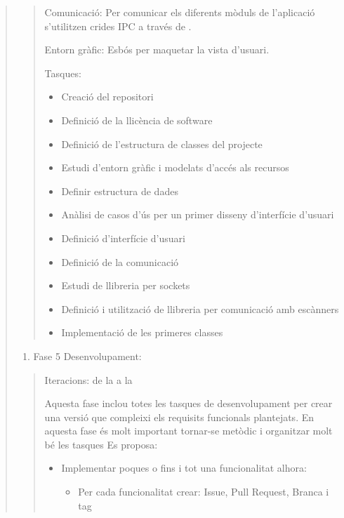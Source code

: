 \documentclass[letterpaper,11pt,catalan]{sphinxmanual}
\begin{document}
\begin{quote}
\begin{quote}
Comunicació: Per comunicar els diferents mòduls de l'aplicació s'utilitzen crides
IPC a través de .

Entorn gràfic: Esbós per maquetar la vista d'usuari.

Tasques:
\begin{itemize}
\item {} 
Creació del repositori

\item {} 
Definició de la llicència de software

\item {} 
Definició de l'estructura de classes del projecte

\item {} 
Estudi d'entorn gràfic i modelats d'accés als recursos

\item {} 
Definir estructura de dades

\item {} 
Anàlisi de casos d'ús per un primer disseny d'interfície d'usuari

\item {} 
Definició d'interfície d'usuari

\item {} 
Definició de la comunicació

\item {} 
Estudi de llibreria per sockets

\item {} 
Definició i utilització de llibreria per comunicació amb escànners

\item {} 
Implementació de les primeres classes

\end{itemize}
\end{quote}
\begin{enumerate}
\item {} 
Fase 5 Desenvolupament:

\end{enumerate}
\begin{quote}

Iteracions: de la  a la 

Aquesta fase inclou totes les tasques de desenvolupament per crear una versió
que compleixi els requisits funcionals plantejats.
En aquesta fase és molt important tornar-se metòdic i organitzar molt bé les tasques
Es proposa:
\begin{itemize}
\item {} 
Implementar poques o fins i tot una funcionalitat alhora:
\begin{itemize}
\item {} 
Per cada funcionalitat crear: Issue, Pull Request, Branca i tag


\end{itemize}
\end{itemize}
\end{quote}
\end{quote}
\end{document}
